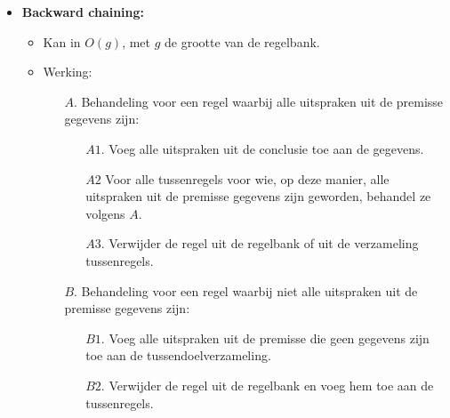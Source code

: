 \begin{itemize}
\begin{itemize}
\begin{itemize}
\begin{itemize}
				\item Stel nu dat we een huisdier hebben, Fritz,  en er zijn twee dingen bekend over hem: hij kwaakt en eet vliegen. We willen nu de kleur weten.
				\item Fritz wordt gesubstitueerd voor $X$ in regel 1, maar hij voldoet niet aan de premisse. Hij wordt nu gesubstitueerd voor $X$ in regel 2, zodat er besloten wordt dat hij een kikker is. Dit wordt dan toegevoegd aan de gegevens. We weten nu dat Fritz kwaakt, dat hij vliegen eet en dat hij een kikker is.
				\item Fritz kan nu gesubstitueerd worden in regel 3, zodat er besloten wordt dat hij groen is.
			\end{itemize}
			\item Forward Chaining werkt van links naar rechts, startend vanaf de gekende feiten om tot een conclusie te komen.
			\alert In het algoritme kunnen regels toegepast worden die uiteindelijk niet bijdragen tot de oplossing. Men probeert dit efficiënter op te lossen met backwards chaining.
		\end{itemize}
		\item \textbf{Backward chaining:}
		\begin{itemize}
			\item Kan in $O(g)$, met $g$ de grootte van de regelbank.
			\item Werking:
			\begin{enumerate}
				\item[$A.$] Behandeling voor een regel waarbij alle uitspraken uit de premisse gegevens zijn:
				\begin{enumerate}
					\item[$A1.$] Voeg alle uitspraken uit de conclusie toe aan de gegevens.
					\item[$A2$] Voor alle tussenregels voor wie, op deze manier, alle uitspraken uit de premisse gegevens zijn geworden, behandel ze volgens $A$.
					\item[$A3.$] Verwijder de regel uit de regelbank of uit de verzameling tussenregels.
				\end{enumerate}
				\item[$B.$] Behandeling voor een regel waarbij niet alle uitspraken uit de premisse gegevens zijn:
				\begin{enumerate}
					\item[$B1.$] Voeg alle uitspraken uit de premisse die geen gegevens zijn toe aan de tussendoelverzameling.
					\item[$B2.$] Verwijder de regel uit de regelbank en voeg hem toe aan de tussenregels.

\end{enumerate}
\end{enumerate}
\end{itemize}
\end{itemize}
\end{itemize}
